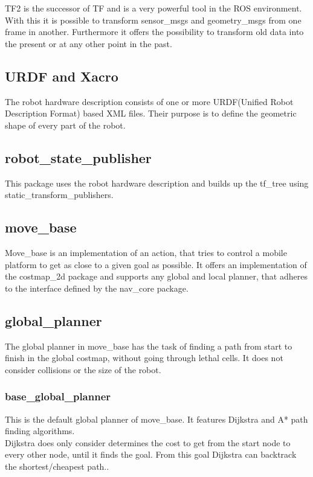 TF2 is the successor of TF and is a very powerful tool in the ROS environment. With this it is possible to transform sensor\_msgs and geometry\_msgs from one frame in another. Furthermore it offers the possibility to transform old data into the present or at any other point in the past.

\subsection{URDF and Xacro}
The robot hardware description consists of one or more URDF(Unified Robot Description Format) based XML files. Their purpose is to define the geometric shape of every part of the robot. 

\subsection{robot\_state\_publisher}
	This package uses the robot hardware description and builds up the tf\_tree using static\_transform\_publishers.


\subsection{move\_base}
Move\_base is an implementation of an action, that tries to control a mobile platform to get as close to a given goal as possible. It offers an implementation of the costmap\_2d package and supports any global and local planner, that adheres to the interface defined by the nav\_core package\cite{movebase}.

\subsection{global\_planner}
The global planner in move\_base has the task of finding a path from start to finish in the global costmap, without going through lethal cells. It does not consider collisions or the size of the robot.

\subsubsection{base\_global\_planner}
This is the default global planner of move\_base. It features Dijkstra and A* path finding algorithms.\\

Dijkstra does only consider determines the cost to get from the start node to every other node, until it finds the goal. From this goal Dijkstra can backtrack the shortest/cheapest path.\cite{AlgorithmenundDatenstrukturen}.\\

